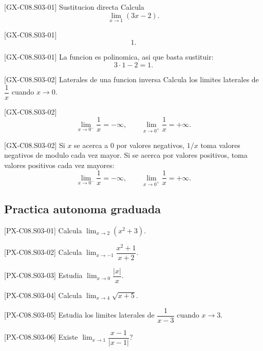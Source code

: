 \begin{guidedexercise}{[GX-C08.S03-01] Sustitucion directa}
Calcula
\[
\lim_{x\to 1}(3x-2).
\]
\end{guidedexercise}

\begin{shortanswer}{[GX-C08.S03-01]}
\[
1.
\]
\end{shortanswer}

\begin{fullsolution}{[GX-C08.S03-01]}
La funcion es polinomica, asi que basta sustituir:
\[
3\cdot 1-2=1.
\]
\end{fullsolution}

\begin{guidedexercise}{[GX-C08.S03-02] Laterales de una funcion inversa}
Calcula los limites laterales de \(\dfrac{1}{x}\) cuando \(x\to 0\).
\end{guidedexercise}

\begin{shortanswer}{[GX-C08.S03-02]}
\[
\lim_{x\to 0^-}\frac{1}{x}=-\infty,\qquad
\lim_{x\to 0^+}\frac{1}{x}=+\infty.
\]
\end{shortanswer}

\begin{fullsolution}{[GX-C08.S03-02]}
Si \(x\) se acerca a \(0\) por valores negativos, \(1/x\) toma valores negativos de modulo cada
vez mayor. Si se acerca por valores positivos, toma valores positivos cada vez mayores:
\[
\lim_{x\to 0^-}\frac{1}{x}=-\infty,\qquad
\lim_{x\to 0^+}\frac{1}{x}=+\infty.
\]
\end{fullsolution}

\subsection*{Practica autonoma graduada}
\begin{exercise}{[PX-C08.S03-01] Calcula \(\lim_{x\to 2}(x^2+3)\).}
\end{exercise}
\begin{exercise}{[PX-C08.S03-02] Calcula \(\lim_{x\to -1}\dfrac{x^2+1}{x+2}\).}
\end{exercise}
\begin{exercise}{[PX-C08.S03-03] Estudia \(\lim_{x\to 0}\dfrac{|x|}{x}\).}
\end{exercise}
\begin{exercise}{[PX-C08.S03-04] Calcula \(\lim_{x\to 4}\sqrt{x+5}\).}
\end{exercise}
\begin{exercise}{[PX-C08.S03-05] Estudia los limites laterales de \(\dfrac{1}{x-3}\) cuando \(x\to 3\).}
\end{exercise}
\begin{exercise}{[PX-C08.S03-06] Existe \(\lim_{x\to 1}\dfrac{x-1}{|x-1|}\)?}
\end{exercise}

